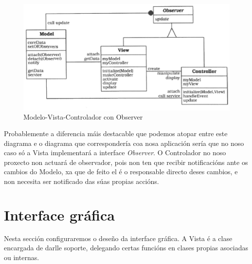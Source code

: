 \begin{figure}
\centering
\includegraphics[width=\textwidth,height=\textheight,keepaspectratio]{figuras/MVC-observer}
\caption{Modelo-Vista-Controlador con Observer}
\label{MVC-observer}
\end{figure}

Probablemente a diferencia máis destacable que podemos atopar entre este diagrama e o diagrama que correspondería coa nosa aplicación sería que no noso caso só a Vista implementará a interface \textit{Observer}. O Controlador no noso proxecto non actuará de observador, pois non ten que recibir notificacións ante os cambios do Modelo, xa que de feito el é o responsable directo deses cambios, e non necesita ser notificado das súas propias accións.

\section{Interface gráfica}

Nesta sección configuraremos o deseño da interface gráfica. A Vista é a clase encargada de darlle soporte, delegando certas funcións en clases propias asociadas ou internas.